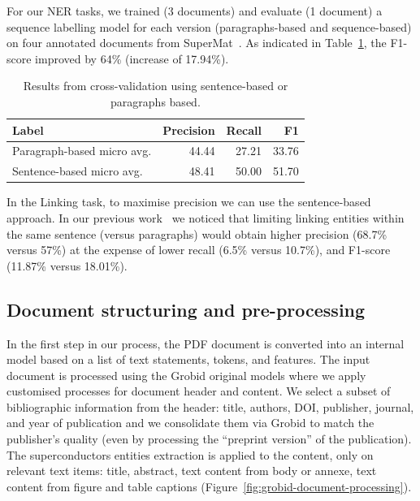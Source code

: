 \documentclass{article}
\begin{document}
For our NER tasks, we trained (3 documents) and evaluate (1 document) a sequence labelling model for each version (paragraphs-based and sequence-based) on four annotated documents from SuperMat~\cite{foppiano2021supermat}.
As indicated in Table~\ref{tab:comparison-evaluation-sentences-paragraphs}, the F1-score improved by 64\% (increase of 17.94\%).

\begin{table}[ht]
\centering\small
\begin{tabular}{lrrr}
\toprule
\textbf{Label} & \textbf{Precision} & \textbf{Recall} & \textbf{F1} \\
\midrule
Paragraph-based micro avg. & 44.44 & 27.21 & 33.76   \\
Sentence-based micro avg. & 48.41 & 50.00 & 51.70  \\
\bottomrule
\end{tabular}
\caption{\label{tab:comparison-evaluation-sentences-paragraphs} Results from cross-validation using sentence-based or paragraphs based.  }
\end{table}

In the Linking task, to maximise precision we can use the sentence-based approach. In our previous work~\cite{foppiano2019proposal} we noticed that limiting linking entities within the same sentence (versus paragraphs) would obtain higher precision (68.7\% versus 57\%) at the expense of lower recall (6.5\% versus 10.7\%), and F1-score (11.87\% versus 18.01\%). 


\subsection{Document structuring and pre-processing}
\label{subsubsec:document-structuring}
In the first step in our process, the PDF document is converted into an internal model based on a list of text statements, tokens, and features. 
The input document is processed using the Grobid original models where we apply customised processes for document header and content. 
We select a subset of bibliographic information from the header: title, authors, DOI, publisher, journal, and year of publication and we consolidate them via Grobid to match the publisher's quality (even by processing the ``preprint version'' of the publication). 
The superconductors entities extraction is applied to the content, only on relevant text items: title, abstract, text content from body or annexe, text content from figure and table captions (Figure~\ref{fig:grobid-document-processing}).
\end{document}
